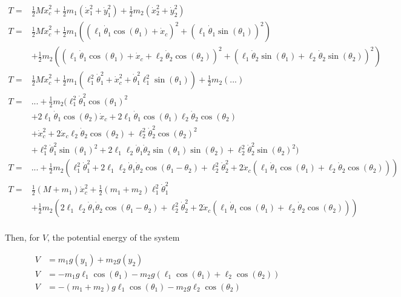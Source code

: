 \documentclass[10pt]{article}
\begin{document}
    \begin{equation}
        \begin{aligned} \label{eq:kinetic}
            T = &\frac{1}{2}  M  \dot x_c^2 + \frac{1}{2}  m_1(\dot x_1^2 + \dot y_1^2) + \frac{1}{2}m_2(\dot x_2^2 + \dot y_2^2) \\
            T = &\frac{1}{2}  M  \dot x_c^2 + \frac{1}{2}  m_1\left((\ell_1 \dot \theta_1 \cos(\theta_1) + \dot x_c)^2 + (\ell_1 \dot \theta_1 \sin(\theta_1))^2\right) \\
            &+ \frac{1}{2}  m_2\left((\ell_1 \dot \theta_1 \cos(\theta_1) + \dot x_c + \ell_2 \dot \theta_2\cos(\theta_2))^2 + (\ell_1 \dot \theta_2 \sin(\theta_1) + \ell_2\dot\theta_2\sin(\theta_2))^2\right)\\
            T = &\frac{1}{2} M\dot x_c^2 + \frac{1}{2}m_1(\ell_1^2\dot\theta_1^2 + \dot x_c^2 + \dot\theta_1^2\ell_1^2\sin(\theta_1)) + \frac{1}{2} m_2(...)\\
            T = &... + \frac{1}{2}m_2(\ell_1^2\dot\theta_1^2\cos(\theta_1)^2   \\
             &+ 2\ell_1\dot\theta_1\cos(\theta_2)\dot x_c + 2\ell_1\dot\theta_1\cos(\theta_1)\ell_2\dot\theta_2\cos(\theta_2)\\
             &+ \dot x_c^2 + 2\dot x_c \ell_2 \dot \theta_2 \cos(\theta_2) + \ell_2^2\dot\theta_2^2\cos(\theta_2)^2 \\
             &+\ell_1^2\dot\theta_1^2\sin(\theta_1)^2  +   2\ell_1\ell_2\dot\theta_1\dot\theta_2\sin(\theta_1)\sin(\theta_2) + \ell_2^2\dot\theta_2^2\sin(\theta_2)^2)\\
             T = &... + \frac{1}{2}m_2(\ell_1^2\dot\theta_1^2 + 2\ell_1\ell_2\dot\theta_1\dot\theta_2\cos(\theta_1 - \theta_2) + \ell_2^2\dot\theta_2^2     +      2\dot x_c(\ell_1\dot\theta_1\cos(\theta_1) + \ell_2\dot\theta_2\cos(\theta_2)))\\
             T = &\frac{1}{2}  (M + m_1)  \dot x_c^2 + \frac{1}{2}(m_1 + m_2)\ell_1^2\dot\theta_1^2\\
                 &+ \frac{1}{2}m_2(2\ell_1\ell_2\dot\theta_1\dot\theta_2\cos(\theta_1 - \theta_2) + \ell_2^2\dot\theta_2^2     +      2\dot x_c(\ell_1\dot\theta_1\cos(\theta_1) + \ell_2\dot\theta_2\cos(\theta_2)))\\
        \end{aligned}
    \end{equation}

    Then, for $V$, the potential energy of the system

    \begin{equation} \label{eq:potential}
        \begin{aligned}
        V &= m_1g(y_1) + m_2g(y_2)     \\
        V &= -m_1g\ell_1\cos(\theta_1) - m_2g(\ell_1\cos(\theta_1) +\ell_2\cos(\theta_2))\\
        V &= -(m_1+m_2)g\ell_1\cos(\theta_1) - m_2g\ell_2\cos(\theta_2)
        \end{aligned}
    \end{equation}
    
\end{document}
